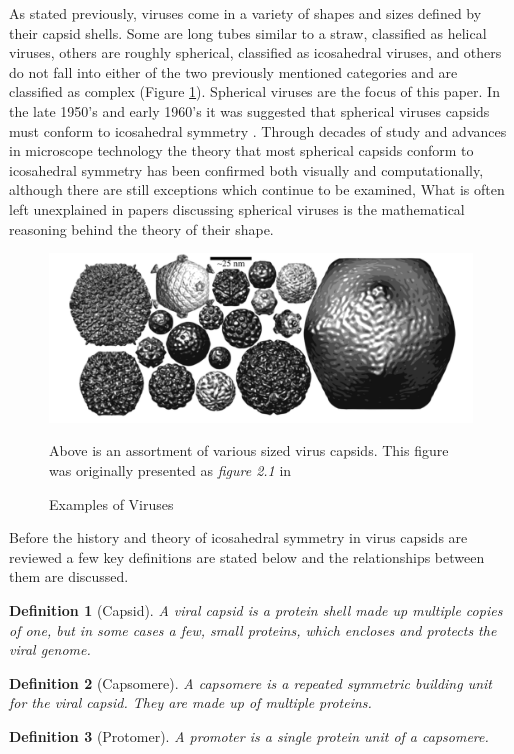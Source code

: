 \documentclass[12pt,letter]{article}
\newtheorem*{definition*}{Definition}
\begin{document}
As stated previously, viruses come in a variety of shapes and sizes defined by their capsid shells. Some are long tubes similar to a straw, classified as helical viruses, others are roughly spherical, classified as icosahedral viruses, and others do not fall into either of the two previously mentioned categories and are classified as complex (Figure \ref{fig:virus_types}). Spherical viruses are the focus of this paper. In the late 1950's and early 1960's it was suggested that spherical viruses capsids must conform to icosahedral symmetry \cite{Crick:1956} \cite{Caspar:1962}. Through decades of study and advances in microscope technology the theory that most spherical capsids conform to icosahedral symmetry has been confirmed both visually and computationally, although there are still exceptions which continue to be examined,  What is often left unexplained in papers discussing spherical viruses is the mathematical reasoning behind the theory of their shape.

\begin{figure}[t!]
	\caption{Examples of Viruses}
	\centering
	\includegraphics[width = .95\textwidth]{viruses.pdf}
	\label{fig:virus_types}
	\begin{minipage}[h]{.85\textwidth}
		\begin{footnotesize}
			Above is an assortment of various sized virus capsids. This figure was originally presented as \textit{figure 2.1} in \cite{Mannige:Thesis}
		\end{footnotesize}
	\end{minipage}
\end{figure}
%
Before the history and theory of icosahedral symmetry in virus capsids are reviewed a few key definitions are stated below and the relationships between them are discussed.
%
\begin{definition*}[Capsid]
A viral capsid is a protein shell made up multiple copies of one, but in some cases a few, small proteins, which encloses and protects the viral genome.
\end{definition*}
\begin{definition*}[Capsomere]
A capsomere is a repeated symmetric building unit for the viral capsid. They are made up of multiple proteins.
\end{definition*}
\begin{definition*}[Protomer]
A promoter is a single protein unit of a capsomere.
\end{definition*}
\end{document}
